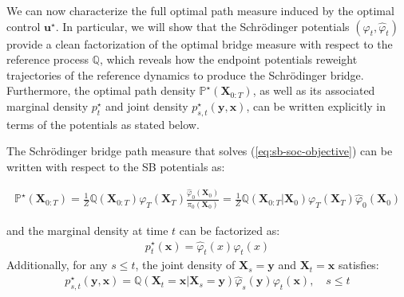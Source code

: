 \documentclass{article}
\begin{document}
We can now characterize the full optimal path measure induced by the optimal control $\boldsymbol{u}^\star$. In particular, we will show that the Schrödinger potentials $(\varphi_t,\hat{\varphi}_t)$ provide a clean factorization of the optimal bridge measure with respect to the reference process $\mathbb{Q}$, which reveals
how the endpoint potentials reweight trajectories of the reference dynamics to produce the Schrödinger bridge. Furthermore, the optimal path density $\mathbb{P}^\star(\boldsymbol{X}_{0:T})$, as well as its associated marginal density $p^\star_t$ and joint density $p^\star_{s,t}(\boldsymbol{y}, \boldsymbol{x})$, can be written explicitly in terms of the potentials as stated below.

\begin{proposition}\label{prop:optimal-path-sbsoc}
    The Schrödinger bridge path measure that solves (\ref{eq:sb-soc-objective}) can be written with respect to the SB potentials as:
    \begin{small}
    \begin{align}
        \mathbb{P}^\star(\boldsymbol{X}_{0:T})=\frac{1}{Z}\mathbb{Q}(\boldsymbol{X}_{0:T}) \varphi_T(\boldsymbol{X}_T)\frac{\hat{\varphi}_0(\boldsymbol{X}_0)}{\pi_0(\boldsymbol{X}_0)}=\frac{1}{Z}\mathbb{Q}(\boldsymbol{X}_{0:T}|\boldsymbol{X}_0)\varphi_T(\boldsymbol{X}_T)\hat{\varphi}_0(\boldsymbol{X}_0)\tag{SB-SOC Path}\label{eq:sb-soc-path-measure}
    \end{align}
    \end{small}
    and the marginal density at time $t$ can be factorized as:
    \begin{align}
        p^\star_t(\boldsymbol{x})=\hat{\varphi}_t(x)\varphi_t(x)\tag{SB-SOC Density}\label{eq:sb-soc-density}
    \end{align}
    Additionally, for any $s\leq t$, the joint density of $\boldsymbol{X}_s=\boldsymbol{y}$ and $\boldsymbol{X}_t=\boldsymbol{x}$ satisfies:
    \begin{align}
        p^\star_{s,t}(\boldsymbol{y}, \boldsymbol{x})=\mathbb{Q}(\boldsymbol{X}_t=\boldsymbol{x}|\boldsymbol{X}_s=\boldsymbol{y})\hat{\varphi}_s(\boldsymbol{y})\varphi_t(\boldsymbol{x}), \quad s\leq t\tag{SB-SOC Joint Density}\label{eq:sb-soc-joint-density}
    \end{align}
\end{proposition}
\end{document}
